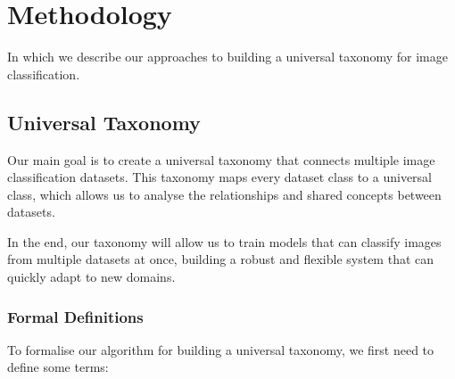 \chapter{Methodology}

\begin{center}
    \begin{minipage}{0.5\textwidth}
        \begin{small}
            In which we describe our approaches to building a universal taxonomy
            for image classification.
        \end{small}
    \end{minipage}
    \vspace{0.5cm}
\end{center}

\section{Universal Taxonomy}

Our main goal is to create a universal taxonomy that connects multiple
image classification datasets.
This taxonomy maps every dataset class to a universal class,
which allows us to analyse the relationships and shared concepts between datasets.

In the end, our taxonomy will allow us to train models that can classify images
from multiple datasets at once, building a robust and flexible system
that can quickly adapt to new domains.

\subsection{Formal Definitions} \label{sec:taxonomy_definitions}

To formalise our algorithm for building a universal taxonomy,
we first need to define some terms:

